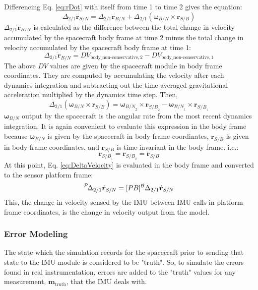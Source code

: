 Differencing Eq. \ref{eq:rDot} with itself from time 1 to time 2 gives the equation:
\begin{equation}
	\Delta_{2/1} 	\dot{\bm{r}}_{S/N} = \Delta_{2/1} \dot{\bm{r}}_{B/N} + \Delta_{2/1} (\bm{\omega}_{B/N} \times \bm{r}_{S/B})
	\label{eq:DeltaVelocity}
\end{equation}
$\Delta_{2/1} \dot{\bm{r}}_{B/N}$ is calculated as the difference between the total change in velocity accumulated by the spacecraft body frame at time 2 minus the total change in velocity accumulated by the spacecraft body frame at time 1:
\begin{equation}
\Delta_{2/1} \dot{\bm{r}}_{B/N} = DV_{\textrm{body\_non-conservative},2} - DV_{\textrm{body\_non-conservative},1}
\end{equation}
The above $DV$ values are given by the spacecraft module in body frame coordinates. They are computed by accumulating the velocity after each dynamics integration and subtracting out the time-averaged gravitational acceleration multiplied by the dynamics time step. Then,
\begin{equation}
	\Delta_{2/1} (\bm{\omega}_{B/N} \times \bm{r}_{S/B}) = \bm{\omega}_{{B/N}_2} \times \bm{r}_{{S/B}_2} - \bm{\omega}_{{B/N}_1} \times \bm{r}_{{S/B}_1}
\end{equation}
$\bm{\omega}_{{B/N}}$ output by the spacecraft is the angular rate from the most recent dynamics integration. It is again convenient to evaluate this expression in the body frame because $\bm{\omega}_{{B/N}}$ is given by the spacecraft in body frame coordinates, $\bm{r}_{S/B}$ is given in body frame coordinates, and $\bm{r}_{S/B}$ is time-invariant in the body frame. i.e.:
\begin{equation}
	\bm{r}_{{S/B}_1} = \bm{r}_{{S/B}_2} = \bm{r}_{S/B}
\end{equation}
 At this point, Eq. \ref{eq:DeltaVelocity} is evaluated in the body frame and converted to the sensor platform frame:
\begin{equation}
\leftexp{P} {\Delta_{2/1}} 	\dot{\bm{r}}_{S/N} = [PB] ^{\mathcal{B}} \Delta_{2/1} 	\dot{\bm{r}}_{S/N}
\end{equation}
This, the change in velocity sensed by the IMU between IMU calls in platform frame coordinates, is the change in velocity output from the model.

\subsubsection{Error Modeling}
The state which the simulation records for the spacecraft prior to sending that state to the IMU module is considered to be "truth". So, to simulate the errors found in real instrumentation, errors are added to the "truth" values for any measurement, $\mathbf{m}_{\mathrm{truth}}$, that the IMU deals with.

